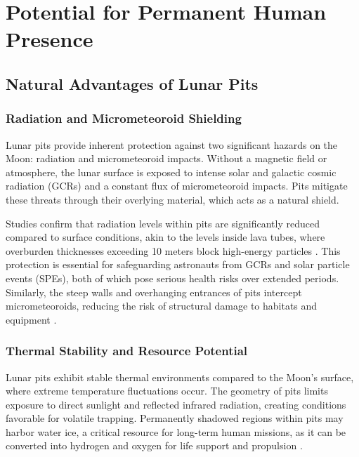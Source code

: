 \graphicspath{{img/ch6}}

\section{Potential for Permanent Human Presence}

\subsection{Natural Advantages of Lunar Pits}

\subsubsection{Radiation and Micrometeoroid Shielding}

Lunar pits provide inherent protection against two significant hazards on the Moon: radiation and micrometeoroid impacts. Without a magnetic field or atmosphere, the lunar surface is exposed to intense solar and galactic cosmic radiation (GCRs) and a constant flux of micrometeoroid impacts. Pits mitigate these threats through their overlying material, which acts as a natural shield.

Studies confirm that radiation levels within pits are significantly reduced compared to surface conditions, akin to the levels inside lava tubes, where overburden thicknesses exceeding 10 meters block high-energy particles \cite{thermal-lunar-pits, newer-thermal}. This protection is essential for safeguarding astronauts from GCRs and solar particle events (SPEs), both of which pose serious health risks over extended periods. Similarly, the steep walls and overhanging entrances of pits intercept micrometeoroids, reducing the risk of structural damage to habitats and equipment \cite{bases-feng, Carrer2024}.

\subsubsection{Thermal Stability and Resource Potential}

Lunar pits exhibit stable thermal environments compared to the Moon’s surface, where extreme temperature fluctuations occur. The geometry of pits limits exposure to direct sunlight and reflected infrared radiation, creating conditions favorable for volatile trapping. Permanently shadowed regions within pits may harbor water ice, a critical resource for long-term human missions, as it can be converted into hydrogen and oxygen for life support and propulsion \cite{jsanders-isru}.

